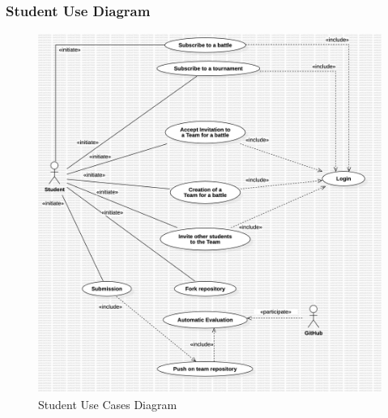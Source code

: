 \subsubsection*{Student Use Diagram}
\begin{figure}[H]
    \centering
    \includegraphics[width=\textwidth]{Diagrams/StudentUseCaseDiagram.jpg}
    \caption{Student Use Cases Diagram}
    \label{fig:student-use-diagram}
\end{figure}

